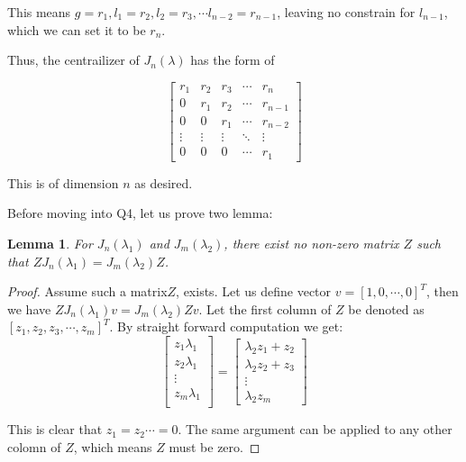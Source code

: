 \documentclass[12pt, a4paper]{article}
\newtheorem{lemma}[theorem]{Lemma}
\theoremstyle{definition}
\theoremstyle{remark}
\begin{document}
This means $g = r_1, l_1 = r_2, l_2 = r_3, \cdots l_{n-2} = r_{n-1}$, leaving no constrain for $l_{n-1}$, which we can set it to be $r_n$.


Thus, the centrailizer of $J_n(\lambda)$ has the form of

$$
	\left[
		\begin{array}{cccccc}
			r_1    & r_2    & r_3    & \cdots & r_{n}   \\
			0      & r_1    & r_2    & \cdots & r_{n-1} \\
			0      & 0      & r_1    & \cdots & r_{n-2} \\
			\vdots & \vdots & \vdots & \ddots & \vdots  \\
			0      & 0      & 0      & \cdots & r_1
		\end{array}
		\right]
$$

This is of dimension $n$ as desired.

Before moving into Q4, let us prove two lemma:

\begin{lemma}\label{lemma:1}
	For $J_n(\lambda_1) $ and $J_m(\lambda_2)$, there exist no non-zero matrix $Z$ such that $ZJ_n(\lambda_1) = J_m(\lambda_2)Z$.
\end{lemma}




\begin{proof}
	Assume such a matrix$Z$, exists. Let us define vector $v = [1, 0, \cdots, 0]^T$, then we have $ZJ_n(\lambda_1)v = J_m(\lambda_2)Zv$. Let the first column of $Z$ be denoted as $[z_1,z_2, z_3, \cdots, z_m ]^T$.
	By straight forward computation we get:
	\begin{equation}
		\left[
			\begin{array}{c}
				z_1 \lambda_1   \\
				z_2 \lambda_1   \\
				\vdots          \\
				z_{m} \lambda_1 \\
			\end{array}
			\right]
		=
		\left[
			\begin{array}{c}
				\lambda_2 z_1 + z_2 \\
				\lambda_2 z_2 + z_3 \\
				\vdots              \\
				\lambda_2 z_{m}
			\end{array}
			\right]
	\end{equation}

	This is clear that $z_1 = z_2 \cdots = 0$. The same argument can be applied to any other colomn of $Z$, which means $Z$ must be zero.
\end{proof}
\end{document}
